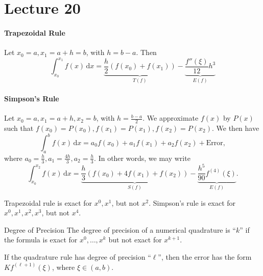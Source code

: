 \documentclass[class=article, crop=false]{standalone}
\begin{document}
  \section{Lecture 20}
  \paragraph{Trapezoidal Rule} Let $x_0 = a, x_1 = a + h = b$, with $h = b - a$. Then
  \[
    \int_{x_0}^{x_1}f(x) \,\mathrm dx = \underbrace{\frac{h}{2}(f(x_0) + f(x_1))}_{T(f)} - \underbrace{\frac{f''(\xi)}{12}h^3}_{E(f)} \tag*{$\xi\in (x_0, x_1)$}
  \]
  \paragraph{Simpson's Rule} Let $x_0 = a, x_1 = a + h, x_2 = b$, with $h = \frac{b - a}{2}$. We approximate $f(x)$ by $P(x)$ such that $f(x_0) = P(x_0), f(x_1) = P(x_1), f(x_2) = P(x_2)$. We then have
  \[
    \int_{a}^{b}f(x) \,\mathrm dx = a_0f(x_0) + a_1f(x_1) + a_2f(x_2) + \text{Error},
  \]
  where $a_0 = \frac{h}{3}, a_1 = \frac{4h}{3}, a_2 = \frac{h}{3}$. In other words, we may write
  \[
    \int_{x_0}^{x_2}f(x) \,\mathrm dx = \underbrace{\frac{h}{3}(f(x_0) + 4f(x_1) + f(x_2))}_{S(f)} - \underbrace{\frac{h^5}{90}f^{(4)}(\xi)}_{E(f)}. \tag*{$\xi\in (x_0, x_2)$}
  \]
  \begin{note}{}
    Trapezoidal rule is exact for $x^0, x^1$, but not $x^2$. Simpson's rule is exact for $x^0, x^1, x^2, x^3$, but not $x^4$.
  \end{note}
  \begin{definition}{Degree of Precision}
    The degree of precision of a numerical quadrature is ``$k$'' if the formula is exact for $x^0,\dotsc,x^k$ but not exact for $x^{k + 1}$.
  \end{definition}
  \begin{note}{}
    If the quadrature rule has degree of precision ``$\ell$'', then the error has the form $Kf^{(\ell + 1)}(\xi)$, where $\xi\in (a, b)$.
  \end{note}
\end{document}
